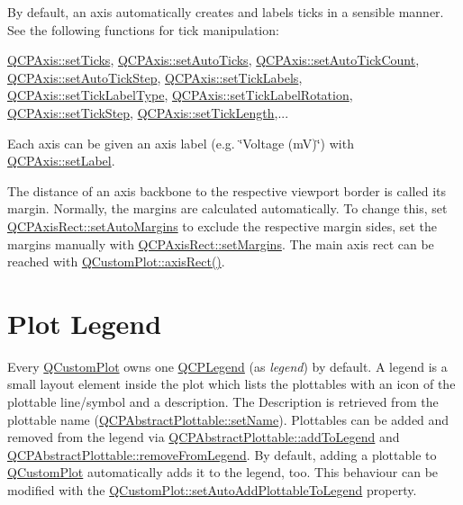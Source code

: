 By default, an axis automatically creates and labels ticks in a sensible manner. See the following functions for tick manipulation\-:\par
 \hyperlink{class_q_c_p_axis_ac891409315bc379e3b1abdb162c1a011}{Q\-C\-P\-Axis\-::set\-Ticks}, \hyperlink{class_q_c_p_axis_ae867c23d3a6a7bd4d09cc66c5d018f63}{Q\-C\-P\-Axis\-::set\-Auto\-Ticks}, \hyperlink{class_q_c_p_axis_a7c7111cbeac9ec5fcb40f93a1ef51a0b}{Q\-C\-P\-Axis\-::set\-Auto\-Tick\-Count}, \hyperlink{class_q_c_p_axis_a99fe77b034e06f5b723995beab96e741}{Q\-C\-P\-Axis\-::set\-Auto\-Tick\-Step}, \hyperlink{class_q_c_p_axis_a04ba16e1f6f78d70f938519576ed32c8}{Q\-C\-P\-Axis\-::set\-Tick\-Labels}, \hyperlink{class_q_c_p_axis_a54f24f5ce8feea25209388a863d7e448}{Q\-C\-P\-Axis\-::set\-Tick\-Label\-Type}, \hyperlink{class_q_c_p_axis_a1bddd4413df8a576b7ad4b067fb33375}{Q\-C\-P\-Axis\-::set\-Tick\-Label\-Rotation}, \hyperlink{class_q_c_p_axis_af727db0acc6492c4c774c0700e738205}{Q\-C\-P\-Axis\-::set\-Tick\-Step}, \hyperlink{class_q_c_p_axis_a62ec40bebe3540e9c1479a8fd2be3b0d}{Q\-C\-P\-Axis\-::set\-Tick\-Length},...

Each axis can be given an axis label (e.\-g. \char`\"{}\-Voltage (m\-V)\char`\"{}) with \hyperlink{class_q_c_p_axis_a33bcc382c111c9f31bb0687352a2dea4}{Q\-C\-P\-Axis\-::set\-Label}.

The distance of an axis backbone to the respective viewport border is called its margin. Normally, the margins are calculated automatically. To change this, set \hyperlink{class_q_c_p_layout_element_accfda49994e3e6d51ed14504abf9d27d}{Q\-C\-P\-Axis\-Rect\-::set\-Auto\-Margins} to exclude the respective margin sides, set the margins manually with \hyperlink{class_q_c_p_layout_element_a8f450b1f3f992ad576fce2c63d8b79cf}{Q\-C\-P\-Axis\-Rect\-::set\-Margins}. The main axis rect can be reached with \hyperlink{class_q_custom_plot_a4a37a1add5fe63060ac518cf0a4c4050}{Q\-Custom\-Plot\-::axis\-Rect()}.\hypertarget{index_mainpage-legend}{}\section{Plot Legend}\label{index_mainpage-legend}
Every \hyperlink{class_q_custom_plot}{Q\-Custom\-Plot} owns one \hyperlink{class_q_c_p_legend}{Q\-C\-P\-Legend} (as {\itshape legend}) by default. A legend is a small layout element inside the plot which lists the plottables with an icon of the plottable line/symbol and a description. The Description is retrieved from the plottable name (\hyperlink{class_q_c_p_abstract_plottable_ab79c7ba76bc7fa89a4b3580e12149f1f}{Q\-C\-P\-Abstract\-Plottable\-::set\-Name}). Plottables can be added and removed from the legend via \hyperlink{class_q_c_p_abstract_plottable_a70f8cabfd808f7d5204b9f18c45c13f5}{Q\-C\-P\-Abstract\-Plottable\-::add\-To\-Legend} and \hyperlink{class_q_c_p_abstract_plottable_aa1f350e510326d012b9a9c9249736c83}{Q\-C\-P\-Abstract\-Plottable\-::remove\-From\-Legend}. By default, adding a plottable to \hyperlink{class_q_custom_plot}{Q\-Custom\-Plot} automatically adds it to the legend, too. This behaviour can be modified with the \hyperlink{class_q_custom_plot_ad8858410c2db47b7104040a3aa61c3fc}{Q\-Custom\-Plot\-::set\-Auto\-Add\-Plottable\-To\-Legend} property.

